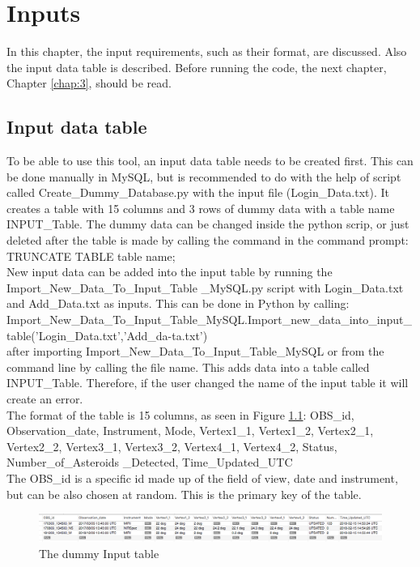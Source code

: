 \chapter{Inputs}
\label{chap:1}

In this chapter, the input requirements, such as their format, are discussed. Also the input data table is described. Before running the code, the next chapter, Chapter \ref{chap:3}, should be read.

\section{Input data table}
To be able to use this tool, an input data table needs to be created first. This can be done manually in MySQL, but is recommended to do with the help of script called Create\_Dummy\_Database.py with the input file (Login\_Data.txt). It creates a table with 15 columns and 3 rows of dummy data with a  table name INPUT\_Table. The dummy data can be changed inside the python scrip, or just deleted after the table is made by calling the command in the command prompt:\\ TRUNCATE TABLE table name;\\

New input data can be added into the input table by running the Import\_New\_Data\_To\_Input\_Table \_MySQL.py script with Login\_Data.txt and Add\_Data.txt as inputs. This can be done in Python by calling: \\ Import\_New\_Data\_To\_Input\_Table\_MySQL.Import\_new\_data\_into\_input\_table('Login\_Data.txt','Add\_da-ta.txt')\\
after importing Import\_New\_Data\_To\_Input\_Table\_MySQL or from the command line by calling the file name. This adds data into a table called INPUT\_Table. Therefore, if the user changed the name of the input table it will create an error. \\

The format of the table is 15 columns, as seen in Figure \ref{fig:1}: OBS\_id, Observation\_date, Instrument, Mode, Vertex1\_1, Vertex1\_2, Vertex2\_1, Vertex2\_2, Vertex3\_1, Vertex3\_2, Vertex4\_1, Vertex4\_2, Status, Number\_of\_Asteroids \_Detected, Time\_Updated\_UTC\\
The OBS\_id is a specific id made up of the field of view, date and instrument, but can be also chosen at random. This is the primary key of the table. \\

\begin{figure}[h]
    \centering
    \includegraphics[width=1\textwidth]{Figures/Inputtable.png}
    \caption{The dummy Input table}
    \label{fig:1}
\end{figure}

